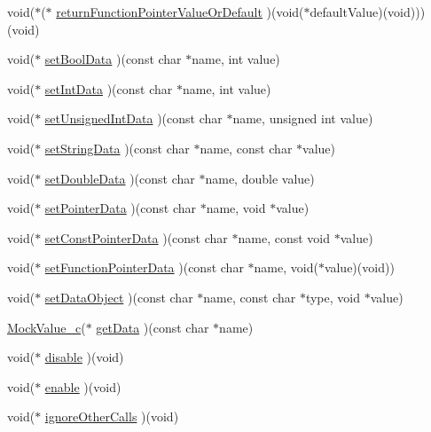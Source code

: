 \begin{DoxyCompactItemize}
\item 
void($\ast$($\ast$ \hyperlink{struct_s_mock_support__c_ab5269cbc4eeedac5d28749d686d40b1b}{return\+Function\+Pointer\+Value\+Or\+Default} )(void($\ast$default\+Value)(void)))(void)
\item 
void($\ast$ \hyperlink{struct_s_mock_support__c_afb17ae0d3880c203cd277457ae33c750}{set\+Bool\+Data} )(const char $\ast$name, int value)
\item 
void($\ast$ \hyperlink{struct_s_mock_support__c_a476aa5f3d7b30361733ff18d68860814}{set\+Int\+Data} )(const char $\ast$name, int value)
\item 
void($\ast$ \hyperlink{struct_s_mock_support__c_a5778dd0c295cc54fb673f2f8353d2457}{set\+Unsigned\+Int\+Data} )(const char $\ast$name, unsigned int value)
\item 
void($\ast$ \hyperlink{struct_s_mock_support__c_af18cdda96bda5cf110b3d3a4bd5f6acd}{set\+String\+Data} )(const char $\ast$name, const char $\ast$value)
\item 
void($\ast$ \hyperlink{struct_s_mock_support__c_a1b426638010163acc67bd1c82779c889}{set\+Double\+Data} )(const char $\ast$name, double value)
\item 
void($\ast$ \hyperlink{struct_s_mock_support__c_a871981311b71da59a485cca9e9a14733}{set\+Pointer\+Data} )(const char $\ast$name, void $\ast$value)
\item 
void($\ast$ \hyperlink{struct_s_mock_support__c_ad5e8d2980ffa18fd21bdc753218a313c}{set\+Const\+Pointer\+Data} )(const char $\ast$name, const void $\ast$value)
\item 
void($\ast$ \hyperlink{struct_s_mock_support__c_aa922bfffb113725fbc6660dc18a88f4a}{set\+Function\+Pointer\+Data} )(const char $\ast$name, void($\ast$value)(void))
\item 
void($\ast$ \hyperlink{struct_s_mock_support__c_ad95e8b1c279dac95298d7f03e735ac8d}{set\+Data\+Object} )(const char $\ast$name, const char $\ast$type, void $\ast$value)
\item 
\hyperlink{_mock_support__c_8h_a31d43adbf229a8eee86044e11318492b}{Mock\+Value\+\_\+c}($\ast$ \hyperlink{struct_s_mock_support__c_ab98102a109f9c5acce0c5dd43f6f1dc8}{get\+Data} )(const char $\ast$name)
\item 
void($\ast$ \hyperlink{struct_s_mock_support__c_ace1449d367bdcce8d6ca549dceac7a7f}{disable} )(void)
\item 
void($\ast$ \hyperlink{struct_s_mock_support__c_a1642c82ad61ded45b6a55d568274bc10}{enable} )(void)
\item 
void($\ast$ \hyperlink{struct_s_mock_support__c_aa10fe8196c2979f976aae1034c938f28}{ignore\+Other\+Calls} )(void)

\end{DoxyCompactItemize}
